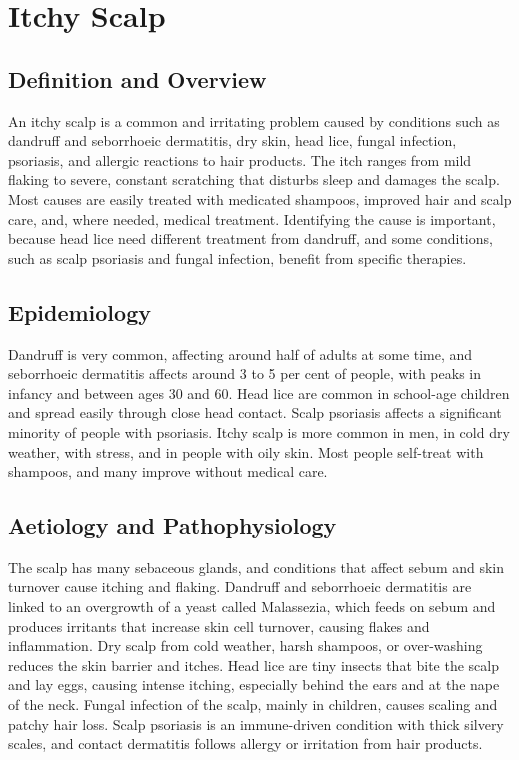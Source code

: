 \chapter{Itchy Scalp}

\section*{Definition and Overview}
An itchy scalp is a common and irritating problem caused by conditions such as dandruff and seborrhoeic dermatitis, dry skin, head lice, fungal infection, psoriasis, and allergic reactions to hair products. The itch ranges from mild flaking to severe, constant scratching that disturbs sleep and damages the scalp. Most causes are easily treated with medicated shampoos, improved hair and scalp care, and, where needed, medical treatment. Identifying the cause is important, because head lice need different treatment from dandruff, and some conditions, such as scalp psoriasis and fungal infection, benefit from specific therapies.

\section*{Epidemiology}
Dandruff is very common, affecting around half of adults at some time, and seborrhoeic dermatitis affects around 3 to 5 per cent of people, with peaks in infancy and between ages 30 and 60. Head lice are common in school-age children and spread easily through close head contact. Scalp psoriasis affects a significant minority of people with psoriasis. Itchy scalp is more common in men, in cold dry weather, with stress, and in people with oily skin. Most people self-treat with shampoos, and many improve without medical care.

\section*{Aetiology and Pathophysiology}
The scalp has many sebaceous glands, and conditions that affect sebum and skin turnover cause itching and flaking. Dandruff and seborrhoeic dermatitis are linked to an overgrowth of a yeast called Malassezia, which feeds on sebum and produces irritants that increase skin cell turnover, causing flakes and inflammation. Dry scalp from cold weather, harsh shampoos, or over-washing reduces the skin barrier and itches. Head lice are tiny insects that bite the scalp and lay eggs, causing intense itching, especially behind the ears and at the nape of the neck. Fungal infection of the scalp, mainly in children, causes scaling and patchy hair loss. Scalp psoriasis is an immune-driven condition with thick silvery scales, and contact dermatitis follows allergy or irritation from hair products.

